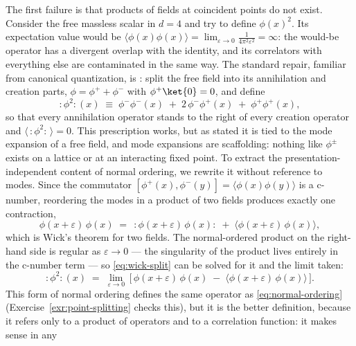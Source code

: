 The first failure is that products of fields at coincident points do not
exist. Consider the free massless scalar in $d = 4$ and try to define
$\phi(x)^2$. Its expectation value would be $\langle \phi(x)\phi(x)\rangle =
\lim_{\varepsilon\to0} \frac{1}{4\pi^2 \varepsilon^2} = \infty$: the would-be
operator has a divergent overlap with the identity, and its correlators with
everything else are contaminated in the same way. The standard repair,
familiar from canonical quantization, is : split the
free field into its annihilation and creation parts, $\phi = \phi^+ +
\phi^-$ with $\phi^+\ket{0} = 0$, and define
\begin{equation}
:\!\phi^2\!:(x) \;\equiv\; \phi^-\phi^-(x) \;+\; 2\,\phi^-\phi^+(x)
\;+\; \phi^+\phi^+(x),
\label{eq:normal-ordering}
\end{equation}
so that every annihilation operator stands to the right of every creation
operator and $\langle\,:\!\phi^2\!:\,\rangle = 0$. This prescription works,
but as stated it is tied to the mode expansion of a free field, and mode
expansions are scaffolding: nothing like $\phi^\pm$ exists on a lattice or at
an interacting fixed point. To extract the presentation-independent content
of normal ordering, we rewrite it without reference to modes. Since the
commutator $[\phi^+(x), \phi^-(y)] = \langle\phi(x)\phi(y)\rangle$ is a
c-number, reordering the modes in a product of two fields produces exactly
one contraction,
\begin{equation}
\phi(x + \varepsilon)\,\phi(x) \;=\;
\,:\!\phi(x+\varepsilon)\,\phi(x)\!:\; +\;
\big\langle \phi(x+\varepsilon)\,\phi(x)\big\rangle ,
\label{eq:wick-split}
\end{equation}
which is Wick's theorem for two fields. The normal-ordered product on the
right-hand side is regular as $\varepsilon \to 0$ --- the singularity of the
product lives entirely in the c-number term --- so \eqref{eq:wick-split} can
be solved for it and the limit taken:
\begin{equation}
:\!\phi^2\!:(x) \;=\; \lim_{\varepsilon \to 0}\,
\Big[\, \phi(x + \varepsilon)\,\phi(x) \;-\;
\big\langle \phi(x+\varepsilon)\,\phi(x)\big\rangle \,\Big].
\label{eq:point-splitting}
\end{equation}
This  form of normal ordering defines the same
operator as \eqref{eq:normal-ordering} (Exercise~\ref{exr:point-splitting}
checks this), but it is the better definition, because it refers only to a
product of operators and to a correlation function: it makes sense in any
